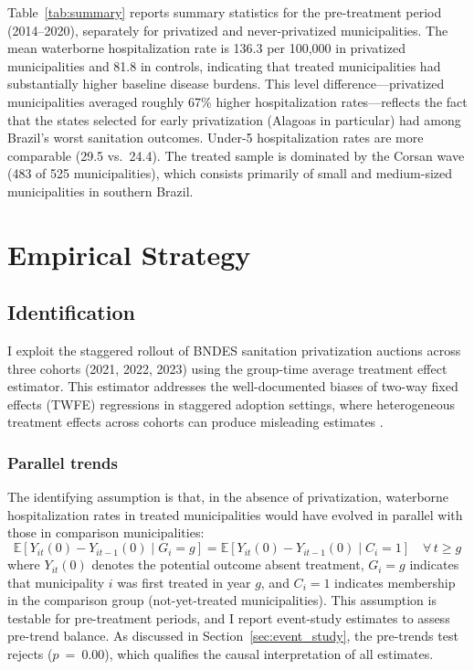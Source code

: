 \documentclass[12pt]{article}
\newcommand{\E}{\mathbb{E}}
\begin{document}
Table~\ref{tab:summary} reports summary statistics for the pre-treatment period (2014--2020), separately for privatized and never-privatized municipalities. The mean waterborne hospitalization rate is 136.3 per 100,000 in privatized municipalities and 81.8 in controls, indicating that treated municipalities had substantially higher baseline disease burdens. This level difference---privatized municipalities averaged roughly 67\% higher hospitalization rates---reflects the fact that the states selected for early privatization (Alagoas in particular) had among Brazil's worst sanitation outcomes. Under-5 hospitalization rates are more comparable (29.5 vs.\ 24.4). The treated sample is dominated by the Corsan wave (483 of 525 municipalities), which consists primarily of small and medium-sized municipalities in southern Brazil.


\section{Empirical Strategy}

\subsection{Identification}

I exploit the staggered rollout of BNDES sanitation privatization auctions across three cohorts (2021, 2022, 2023) using the \citet{callaway2021did} group-time average treatment effect estimator. This estimator addresses the well-documented biases of two-way fixed effects (TWFE) regressions in staggered adoption settings, where heterogeneous treatment effects across cohorts can produce misleading estimates \citep{goodman2021did, dechaisemartin2020two, sun2021estimating, borusyak2024revisiting}.

\subsubsection*{Parallel trends} The identifying assumption is that, in the absence of privatization, waterborne hospitalization rates in treated municipalities would have evolved in parallel with those in comparison municipalities:
\begin{equation}
\E[Y_{it}(0) - Y_{it-1}(0) \mid G_i = g] = \E[Y_{it}(0) - Y_{it-1}(0) \mid C_i = 1] \quad \forall\, t \geq g
\label{eq:pt}
\end{equation}
where $Y_{it}(0)$ denotes the potential outcome absent treatment, $G_i = g$ indicates that municipality $i$ was first treated in year $g$, and $C_i = 1$ indicates membership in the comparison group (not-yet-treated municipalities). This assumption is testable for pre-treatment periods, and I report event-study estimates to assess pre-trend balance. As discussed in Section~\ref{sec:event_study}, the pre-trends test rejects ($p$~=~0.00), which qualifies the causal interpretation of all estimates.
\end{document}
